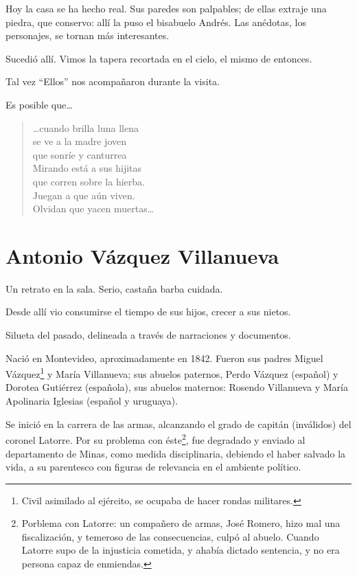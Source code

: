 \documentclass[a4paper]{article}
\begin{document}
Hoy la casa se ha hecho real. Sus paredes son palpables; de ellas extraje una piedra, que conservo: allí la puso el bisabuelo Andrés. Las anédotas, los personajes, se tornan más interesantes. 

Sucedió allí. Vimos la tapera recortada en el cielo, el mismo de entonces.

Tal vez ``Ellos'' nos acompañaron durante la visita.

Es posible que\ldots

\begin{verse}
    \ldots cuando brilla luna llena\\
    se ve a la madre joven\\
    que sonríe y canturrea\\
    Mirando está a sus hijitas\\
    que corren sobre la hierba.\\
    Juegan a que aún viven.\\
    Olvidan que yacen muertas\ldots
\end{verse}

\section{Antonio Vázquez Villanueva}

Un retrato en la sala. Serio, castaña barba cuidada.

Desde allí vio consumirse el tiempo de sus hijos, crecer a sus nietos. 

Silueta del pasado, delineada a través de narraciones y documentos.

Nació en Montevideo, aproximadamente en 1842. Fueron sus padres Miguel Vázquez\footnote{Civil asimilado al ejército, se ocupaba de hacer rondas militares.} y María Villanueva; sus abuelos paternos, Perdo Vázquez (español) y Dorotea Gutiérrez (española), sus abuelos maternos: Rosendo Villanueva y María Apolinaria Iglesias (español y uruguaya).

Se inició en la carrera de las armas, alcanzando el grado de capitán (inválidos) del coronel Latorre. Por su problema con éste\footnote{Porblema con Latorre: un compañero de armas, José Romero, hizo mal una fiscalización, y temeroso de las consecuencias, culpó al abuelo. Cuando Latorre supo de la injusticia cometida, y ahabía dictado sentencia, y no era persona capaz de enmiendas.}, fue degradado y enviado al departamento de Minas, como medida disciplinaria, debiendo el haber salvado la vida, a su parentesco con figuras de relevancia en el ambiente político.
\end{document}
